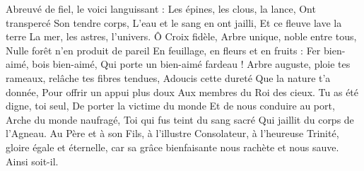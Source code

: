 Abreuvé de fiel, le voici languissant :
Les épines, les clous, la lance,
Ont transpercé Son tendre corps,
L'eau et le sang en ont jailli,
Et ce fleuve lave la terre
La mer, les astres, l'univers.
\versseparator
Ô Croix fidèle,
Arbre unique, noble entre tous,
Nulle forêt n'en produit de pareil
En feuillage, en fleurs et en fruits :
Fer bien-aimé, bois bien-aimé,
Qui porte un bien-aimé fardeau !
\versseparator
Arbre auguste, ploie tes rameaux,
relâche tes fibres tendues,
Adoucis cette dureté
Que la nature t'a donnée,
Pour offrir un appui plus doux
Aux membres du Roi des cieux.
\versseparator
Tu as été digne, toi seul,
De porter la victime du monde
Et de nous conduire au port,
Arche du monde naufragé,
Toi qui fus teint du sang sacré
Qui jaillit du corps de l'Agneau.
\versseparator
Au Père et à son Fils,
à l'illustre Consolateur,
à l'heureuse Trinité,
gloire égale et éternelle,
car sa grâce bienfaisante
nous rachète et nous sauve.
Ainsi soit-il.
